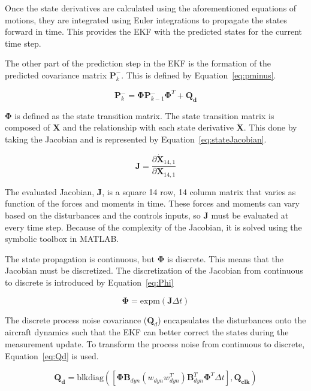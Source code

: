 Once the state derivatives are calculated using the aforementioned equations of motions, they are integrated using Euler integrations to propagate the states forward in time. This provides the EKF with the predicted states for the current time step.

The other part of the prediction step in the EKF is the formation of the predicted covariance matrix \(\mathbf{P}^-_{k}\). This is defined by Equation~\ref{eq:pminus}.

\begin{equation}\label{eq:pminus}
    \mathbf{P}^-_{k} = \mathbf{\Phi}\mathbf{P}^-_{k-1} \mathbf{\Phi}^T + \mathbf{Q_d}
\end{equation}

\( \mathbf{\Phi}\) is defined as the state transition matrix. The state transition matrix is composed of \(\mathbf{X}\) and the relationship with each state derivative \( \dot{\mathbf{X}}\). This done by taking the Jacobian and is represented by Equation~\ref{eq:stateJacobian}.

\begin{equation}\label{eq:stateJacobian}
    \mathbf{J} = \frac{\partial \dot{\mathbf{X}}_{14,1}}{\partial \mathbf{X}_{14,1}}
\end{equation}

The evaluated Jacobian, \(\mathbf{J}\), is a square 14 row, 14 column matrix that varies as function of the forces and moments in time. These forces and moments can vary based on the disturbances and the controls inputs, so \(\mathbf{J}\) must be evaluated at every time step. Because of the complexity of the Jacobian, it is solved using the symbolic toolbox in MATLAB\@.

The state propagation is continuous, but \(\mathbf{\Phi}\) is discrete. This means that the Jacobian must be discretized. The discretization of the Jacobian from continuous to discrete is introduced by Equation~\ref{eq:Phi}

\begin{equation}\label{eq:Phi}
    \mathbf{\Phi} = \textrm{expm}(\mathbf{J}\Delta t)
\end{equation}

The discrete process noise covariance (\(\mathbf{Q}_d\)) encapsulates the disturbances onto the aircraft dynamics such that the EKF can better correct the states during the measurement update. To transform the process noise from continuous to discrete, Equation~\ref{eq:Qd} is used.

\begin{equation}\label{eq:Qd}
    \mathbf{Q_d} = \textrm{blkdiag}\left(\left[\mathbf{\Phi}\mathbf{B}_{dyn} \left(w_{dyn}w_{dyn}^T\right) \mathbf{B}_{dyn}^T \mathbf{\Phi}^T \Delta t\right], \mathbf{Q_{clk}}\right)
\end{equation}

